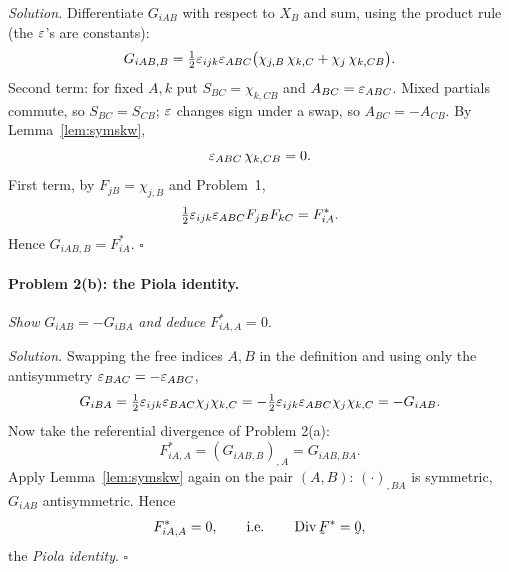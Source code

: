 \emph{Solution.} Differentiate $G_{iAB}$ with respect to $X_B$ and sum,
using the product rule (the $\varepsilon$'s are constants):
\[
   G_{iAB,B}=\tfrac12\varepsilon_{ijk}\varepsilon_{ABC}
   \big(\chi_{j,B}\,\chi_{k,C}+\chi_j\,\chi_{k,CB}\big).
\]
Second term: for fixed $A,k$ put $S_{BC}=\chi_{k,CB}$ and
$A_{BC}=\varepsilon_{ABC}$. Mixed partials commute, so $S_{BC}=S_{CB}$; $\varepsilon$
changes sign under a swap, so $A_{BC}=-A_{CB}$. By
Lemma~\ref{lem:symskw},
\[
   \varepsilon_{ABC}\,\chi_{k,CB}=0 .
\]
First term, by $F_{jB}=\chi_{j,B}$ and Problem~1,
\[
   \tfrac12\varepsilon_{ijk}\varepsilon_{ABC}F_{jB}F_{kC}=F^{*}_{iA}.
\]
Hence $G_{iAB,B}=F^{*}_{iA}$. \hfill$\square$

%
\paragraph*{Problem 2(b): the Piola identity.}
\emph{Show} $G_{iAB}=-G_{iBA}$ \emph{and deduce} $F^{*}_{iA,A}=0$.

\emph{Solution.} Swapping the free indices $A,B$ in the definition and using
only the antisymmetry $\varepsilon_{BAC}=-\varepsilon_{ABC}$,
\[
   G_{iBA}=\tfrac12\varepsilon_{ijk}\varepsilon_{BAC}\chi_j\chi_{k,C}
   =-\tfrac12\varepsilon_{ijk}\varepsilon_{ABC}\chi_j\chi_{k,C}=-G_{iAB}.
\]
Now take the referential divergence of Problem 2(a):
\[
   F^{*}_{iA,A}=(G_{iAB,B})_{,A}=G_{iAB,BA}.
\]
Apply Lemma~\ref{lem:symskw} again on the pair $(A,B)$: $(\cdot)_{,BA}$ is
symmetric, $G_{iAB}$ antisymmetric. Hence
\[
   F^{*}_{iA,A}=0,\qquad\text{i.e.}\qquad \Dvg\bF^{*}=\bze,
\]
the \emph{Piola identity}. \hfill$\square$

